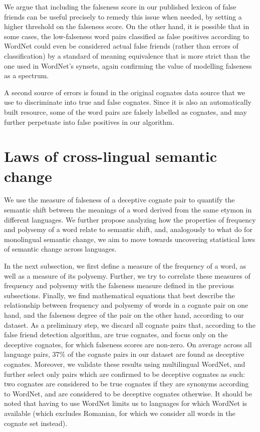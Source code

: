 \documentclass[output=paper]{langsci/langscibook}
\begin{document}
We argue that including the falseness score in our published lexicon of false friends can be useful precisely to remedy this issue when needed, by setting a higher threshold on the falseness score. On the other hand, it is possible that in some cases, the low-falseness word pairs classified as false positives according to WordNet could even be considered actual false friends (rather than errors of classification) by a standard of meaning equivalence that is more strict than the one used in WordNet's synsets, again confirming the value of modelling falseness as a spectrum.

A second source of errors is found in the original cognates data source that we use to discriminate into true and false cognates. Since it is also an automatically built resource, some of the word pairs are falsely labelled as cognates, and may further perpetuate into false positives in our algorithm.

\section{Laws of cross-lingual semantic change}
\label{section:laws-of-semantic-change}


We use the measure of falseness of a deceptive cognate pair to quantify the semantic shift between the meanings of a word derived from the same etymon in different languages. We further propose analyzing how the properties of frequency and polysemy of a word relate to semantic shift, and, analogously to what \citet{hamilton-etal-2016-diachronic} do for monolingual semantic change, we aim to move towards uncovering statistical laws of semantic change across languages.


In the next subsection, we first define a measure of the frequency of a word, as well as a measure of its polysemy. Further, we try to correlate these measures of frequency and polysemy with the falseness measure defined in the previous subsections. Finally, we find mathematical equations that best describe the relationship between frequency and polysemy of words in a cognate pair on one hand, and the falseness degree of the pair on the other hand, according to our dataset. As a preliminary step, we discard all cognate pairs that, according to the false friend detection algorithm, are true cognates, and focus only on the deceptive cognates, for which falseness scores are non-zero. On average across all language pairs, 37\% of the cognate pairs in our dataset are found as deceptive cognates. Moreover, we validate these results using multilingual WordNet, and further select only pairs which are confirmed to be deceptive cognates as such: two cognates are considered to be true cognates if they are synonyms according to WordNet, and are considered to be deceptive cognates otherwise. It should be noted that having to use WordNet limits us to languages for which WordNet is available (which excludes Romanian, for which we consider all words in the cognate set instead).
\end{document}
